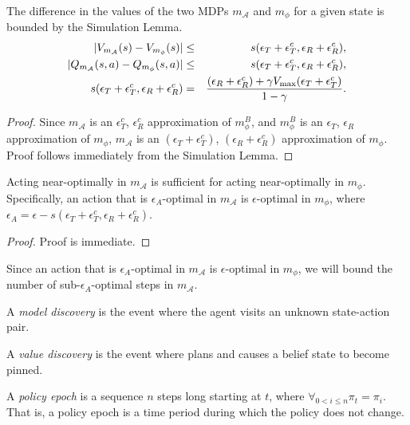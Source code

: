 \begin{lemma}
The difference in the values of the two MDPs $m_{\mathcal{A}}$ and $m_\phi$ for a given state is bounded by the Simulation Lemma.
\begin{eqnarray}
|V_{m_\mathcal{A}}(s) - V_{m_\phi}(s)| &\leq& s(\epsilon_T+\epsilon^c_T,\epsilon_R+\epsilon^c_R),\\
|Q_{m_\mathcal{A}}(s,a) - Q_{m_\phi}(s,a)| &\leq& s(\epsilon_T+\epsilon^c_T,\epsilon_R+\epsilon^c_R),\\
s(\epsilon_T+\epsilon^c_T,\epsilon_R+\epsilon^c_R) &=& \frac {(\epsilon_R+\epsilon^c_R) + \gamma V_{\rm max}(\epsilon_T+\epsilon^c_T)} {1-\gamma}.
\end{eqnarray}
\end{lemma}
\begin{proof}
Since $m_\mathcal{A}$ is an $\epsilon^c_T$, $\epsilon^c_R$ approximation of $m_\phi^B$, and $m_\phi^B$ is an $\epsilon_T$, $\epsilon_R$ approximation of $m_\phi$, $m_\mathcal{A}$ is an $(\epsilon_T+\epsilon^c_T)$, $(\epsilon_R+\epsilon^c_R)$ approximation of $m_\phi$. Proof follows immediately from the Simulation Lemma.
\end{proof}

\begin{lemma}
Acting near-optimally in $m_\mathcal{A}$ is sufficient for acting near-optimally in $m_\phi$. 
Specifically, an action that is $\epsilon_A$-optimal in $m_\mathcal{A}$ is $\epsilon$-optimal in $m_\phi$, where $\epsilon_A=\epsilon - s(\epsilon_T+\epsilon^c_T,\epsilon_R+\epsilon^c_R)$.
\end{lemma}
\begin{proof}
Proof is immediate.
\end{proof}

Since an action that is $\epsilon_A$-optimal in $m_\mathcal{A}$ is $\epsilon$-optimal in $m_\phi$, we will bound the number of sub-$\epsilon_A$-optimal steps in $m_\mathcal{A}$.



\begin{defn}
A \emph{model discovery} is the event where the agent visits an unknown state-action pair.
\end{defn}

\begin{defn}
A \emph{value discovery} is the event where  plans and causes a belief state to become pinned.
\end{defn}

\begin{defn}
A \emph{policy epoch} is a sequence $n$ steps long starting at $t$, where $\forall_{0<i\leq n} \pi_t = \pi_i$. That is, a policy epoch is a time period during which the policy does not change.
\end{defn}

